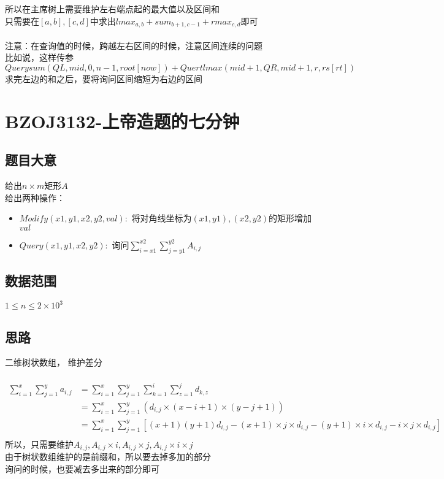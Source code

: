\documentclass{ctexart}
\numberwithin{equation}{section}
\begin{document}
\begin{flushleft}
  所以在主席树上需要维护左右端点起的最大值以及区间和\\
  只需要在$[a,b],[c,d]$中求出$lmax_{a,b}+sum_{b+1, c-1}+rmax_{c,d}$即可\\
  ~\\
  注意：在查询值的时候，跨越左右区间的时候，注意区间连续的问题\\
  比如说，这样传参$Querysum(QL, mid, 0, n-1, root[now])+Quertlmax(mid+1, QR, mid+1, r, rs[rt])$\\
  求完左边的和之后，要将询问区间缩短为右边的区间\\
  
  \newpage

  \section{BZOJ3132-上帝造题的七分钟}
  \subsection{题目大意}
  给出$n\times m$矩形$A$\\
  给出两种操作：\\
  \begin{itemize}
  \item $Modify(x1, y1, x2, y2, val):$ 将对角线坐标为$(x1,y1),(x2, y2)$的矩形增加$val$
  \item $Query(x1, y1, x2, y2):$ 询问$\sum_{i=x1}^{x2}\sum_{j=y1}^{y2}A_{i,j}$
  \end{itemize}
  \subsection{数据范围}
  $1\le n \le 2\times 10^3$
  \subsection{思路}
  二维树状数组， 维护差分\\
  ~\\
  \begin{align*}
    \sum_{i=1}^x\sum_{j=1}^ya_{i,j} &=\sum_{i=1}^x\sum_{j=1}^y\sum_{k=1}^i\sum_{z=1}^jd_{k,z}\\
    &=\sum_{i=1}^x\sum_{j=1}^y(d_{i,j}\times (x-i+1)\times (y-j+1))\\
    &=\sum_{i=1}^x\sum_{j=1}^y[(x+1)(y+1)d_{i,j}-(x+1)\times j\times d_{i,j}-(y+1)\times i\times d_{i,j}-i\times j\times d_{i,j}]\\
  \end{align*}
  所以，只需要维护$A_{i,j},A_{i,j}\times i,A_{i,j}\times j,A_{i,j}\times i\times j$\\
  由于树状数组维护的是前缀和，所以要去掉多加的部分\\
  询问的时候，也要减去多出来的部分即可\\
  \newpage


\end{flushleft}
\end{document}
